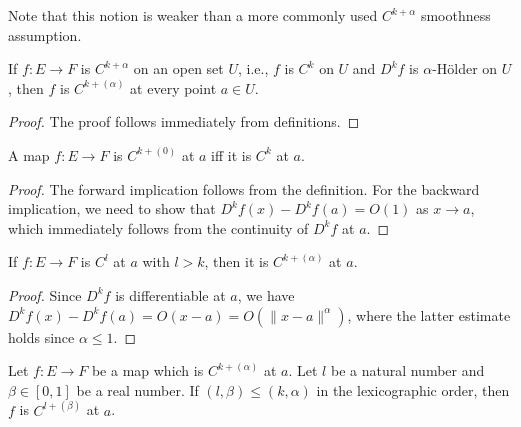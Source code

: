 Note that this notion is weaker than a more commonly used \(C^{k+\alpha}\) smoothness assumption.
\begin{lemma}%
  \label{def:contdiffholder-imp-cdh-at}
  \leanok%
  If \(f\colon E \to F\) is \(C^{k+\alpha}\) on an open set \(U\),
  i.e., \(f\) is \(C^{k}\) on \(U\) and \(D^{k}f\) is \(\alpha\)-Hölder on \(U\),
  then \(f\) is \(C^{k+(\alpha)}\) at every point \(a \in U\).
\end{lemma}
\begin{proof}
  \leanok%
  The proof follows immediately from definitions.
\end{proof}

\begin{lemma}%
  \label{lem:cdh-at-zero}
  \leanok%
  A map \(f\colon E\to F\) is \(C^{k+(0)}\) at \(a\) iff it is \(C^{k}\) at \(a\).
\end{lemma}

\begin{proof}
  \leanok%
  The forward implication follows from the definition.
  For the backward implication,
  we need to show that \(D^{k}f(x) - D^{k}f(a)=O(1)\) as \(x\to a\),
  which immediately follows from the continuity of \(D^{k}f\) at \(a\).
\end{proof}

\begin{lemma}%
  \label{lem:cdh-at-of-contDiffAt}
  \leanok%
  If \(f\colon E\to F\) is \(C^{l}\) at \(a\) with \(l > k\),
  then it is \(C^{k+(\alpha)}\) at \(a\).
\end{lemma}
\begin{proof}
  \leanok%
  Since \(D^{k}f\) is differentiable at \(a\), we have \(D^{k}f(x)-D^{k}f(a)=O(x - a)=O(\|x - a\|^{\alpha})\),
  where the latter estimate holds since \(\alpha \le 1\).
\end{proof}

\begin{lemma}%
  \label{lem:cdh-at-mono}
  \leanok%
  Let \(f\colon E\to F\) be a map which is \(C^{k+(\alpha)}\) at \(a\).
  Let \(l\) be a natural number and \(\beta \in [0, 1]\) be a real number.
  If \((l, \beta) \le (k, \alpha)\) in the lexicographic order,
  then \(f\) is \(C^{l+(\beta)}\) at \(a\).
\end{lemma}

